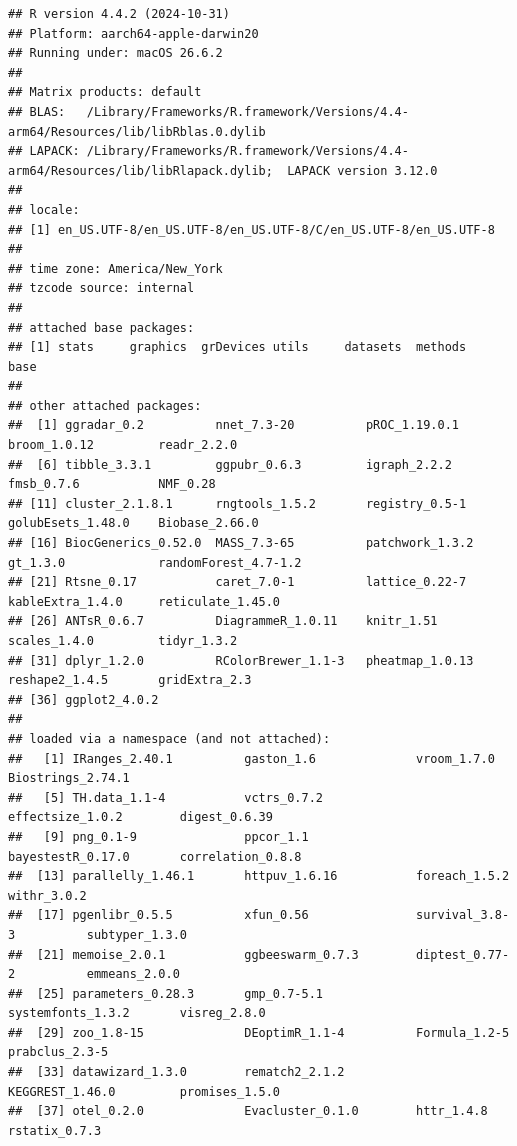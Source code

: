 \documentclass[
]{article}
\begin{document}
\begin{verbatim}
## R version 4.4.2 (2024-10-31)
## Platform: aarch64-apple-darwin20
## Running under: macOS 26.6.2
## 
## Matrix products: default
## BLAS:   /Library/Frameworks/R.framework/Versions/4.4-arm64/Resources/lib/libRblas.0.dylib 
## LAPACK: /Library/Frameworks/R.framework/Versions/4.4-arm64/Resources/lib/libRlapack.dylib;  LAPACK version 3.12.0
## 
## locale:
## [1] en_US.UTF-8/en_US.UTF-8/en_US.UTF-8/C/en_US.UTF-8/en_US.UTF-8
## 
## time zone: America/New_York
## tzcode source: internal
## 
## attached base packages:
## [1] stats     graphics  grDevices utils     datasets  methods   base     
## 
## other attached packages:
##  [1] ggradar_0.2          nnet_7.3-20          pROC_1.19.0.1        broom_1.0.12         readr_2.2.0         
##  [6] tibble_3.3.1         ggpubr_0.6.3         igraph_2.2.2         fmsb_0.7.6           NMF_0.28            
## [11] cluster_2.1.8.1      rngtools_1.5.2       registry_0.5-1       golubEsets_1.48.0    Biobase_2.66.0      
## [16] BiocGenerics_0.52.0  MASS_7.3-65          patchwork_1.3.2      gt_1.3.0             randomForest_4.7-1.2
## [21] Rtsne_0.17           caret_7.0-1          lattice_0.22-7       kableExtra_1.4.0     reticulate_1.45.0   
## [26] ANTsR_0.6.7          DiagrammeR_1.0.11    knitr_1.51           scales_1.4.0         tidyr_1.3.2         
## [31] dplyr_1.2.0          RColorBrewer_1.1-3   pheatmap_1.0.13      reshape2_1.4.5       gridExtra_2.3       
## [36] ggplot2_4.0.2       
## 
## loaded via a namespace (and not attached):
##   [1] IRanges_2.40.1          gaston_1.6              vroom_1.7.0             Biostrings_2.74.1      
##   [5] TH.data_1.1-4           vctrs_0.7.2             effectsize_1.0.2        digest_0.6.39          
##   [9] png_0.1-9               ppcor_1.1               bayestestR_0.17.0       correlation_0.8.8      
##  [13] parallelly_1.46.1       httpuv_1.6.16           foreach_1.5.2           withr_3.0.2            
##  [17] pgenlibr_0.5.5          xfun_0.56               survival_3.8-3          subtyper_1.3.0         
##  [21] memoise_2.0.1           ggbeeswarm_0.7.3        diptest_0.77-2          emmeans_2.0.0          
##  [25] parameters_0.28.3       gmp_0.7-5.1             systemfonts_1.3.2       visreg_2.8.0           
##  [29] zoo_1.8-15              DEoptimR_1.1-4          Formula_1.2-5           prabclus_2.3-5         
##  [33] datawizard_1.3.0        rematch2_2.1.2          KEGGREST_1.46.0         promises_1.5.0         
##  [37] otel_0.2.0              Evacluster_0.1.0        httr_1.4.8              rstatix_0.7.3          

\end{verbatim}
\end{document}
